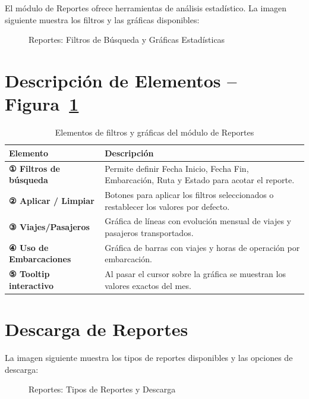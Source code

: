 \documentclass[12pt,a4paper]{report}
\begin{document}
El módulo de Reportes ofrece herramientas de análisis estadístico. La imagen siguiente muestra los filtros y las gráficas disponibles:

\begin{figure}[H]
  \centering
  \fbox{\rule{0pt}{4cm}\hspace{10cm}}
  \caption{Reportes: Filtros de Búsqueda y Gráficas Estadísticas}
  \label{fig:reportes1}
\end{figure}

\section{Descripción de Elementos -- Figura~\ref{fig:reportes1}}

\begin{table}[H]
  \centering
  \renewcommand{\arraystretch}{1.4}
  \begin{tabularx}{\textwidth}{@{}L{5cm} X@{}}
    \toprule
    \textbf{Elemento} & \textbf{Descripción} \\
    \midrule
    \textbf{① Filtros de búsqueda} & Permite definir Fecha Inicio, Fecha Fin, Embarcación, Ruta y Estado para acotar el reporte. \\
    \textbf{② Aplicar / Limpiar} & Botones para aplicar los filtros seleccionados o restablecer los valores por defecto. \\
    \textbf{③ Viajes/Pasajeros} & Gráfica de líneas con evolución mensual de viajes y pasajeros transportados. \\
    \textbf{④ Uso de Embarcaciones} & Gráfica de barras con viajes y horas de operación por embarcación. \\
    \textbf{⑤ Tooltip interactivo} & Al pasar el cursor sobre la gráfica se muestran los valores exactos del mes. \\
    \bottomrule
  \end{tabularx}
  \caption{Elementos de filtros y gráficas del módulo de Reportes}
\end{table}

\section{Descarga de Reportes}

La imagen siguiente muestra los tipos de reportes disponibles y las opciones de descarga:

\begin{figure}[H]
  \centering
  \fbox{\rule{0pt}{4cm}\hspace{10cm}}
  \caption{Reportes: Tipos de Reportes y Descarga}
  \label{fig:reportes2}
\end{figure}
\end{document}
